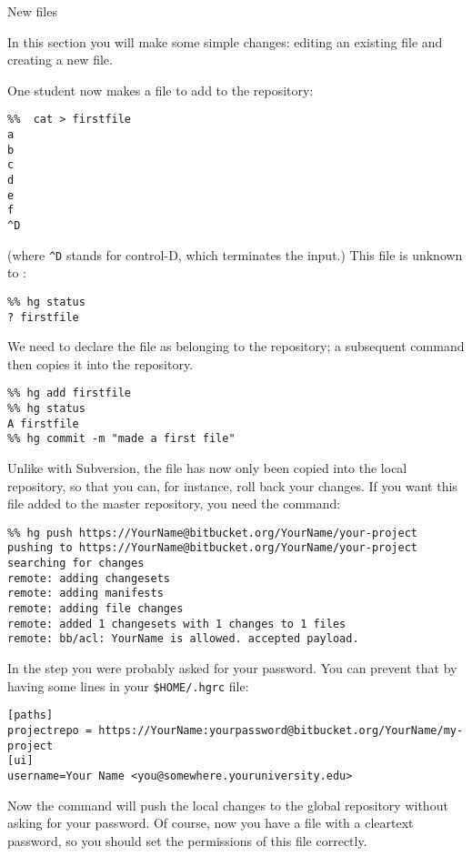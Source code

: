 
 {New files}
\label{sec:hg-push}

\begin{purpose}
  In this section you will make some simple changes: editing an
  existing file and creating a new file.
\end{purpose}

One student now makes a file to add to the repository:
\begin{verbatim}
%%  cat > firstfile
a
b
c
d
e
f
^D
\end{verbatim}
(where \verb+^D+ stands for control-D, which terminates the input.)
This file is unknown to :
\begin{verbatim}
%% hg status
? firstfile
\end{verbatim}
We need to declare the file as belonging to the repository; a
subsequent  command then copies it into the repository.
\begin{verbatim}
%% hg add firstfile 
%% hg status
A firstfile
%% hg commit -m "made a first file"
\end{verbatim}
Unlike with Subversion, the file has now only been copied into the 
local repository, so that you can, for instance, roll back your
changes. If you want this file added to the master repository,
you need the  command:
\begin{verbatim}
%% hg push https://YourName@bitbucket.org/YourName/your-project
pushing to https://YourName@bitbucket.org/YourName/your-project
searching for changes
remote: adding changesets
remote: adding manifests
remote: adding file changes
remote: added 1 changesets with 1 changes to 1 files
remote: bb/acl: YourName is allowed. accepted payload.
\end{verbatim}
In the  step you were probably asked for your password. You can
prevent that by having some lines in your \verb+$HOME/.hgrc+ file:
{\footnotesize
\begin{verbatim}
[paths]
projectrepo = https://YourName:yourpassword@bitbucket.org/YourName/my-project
[ui]
username=Your Name <you@somewhere.youruniversity.edu>
\end{verbatim}
}
Now the command  will push the local changes
to the global repository without asking for your password. Of course,
now you have a file with a cleartext password, so you should set the
permissions of this file correctly.

